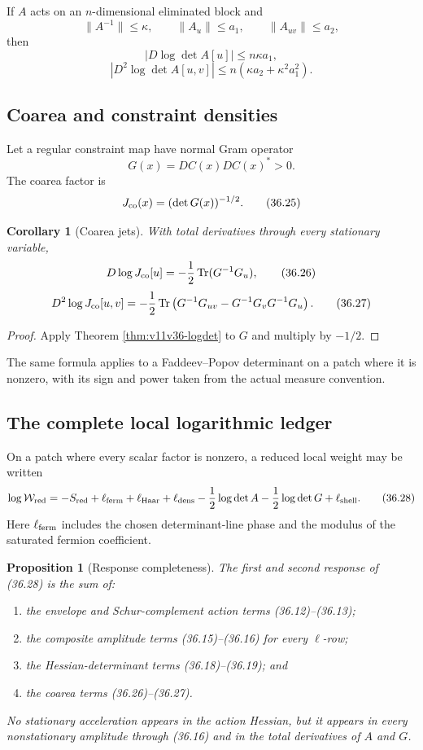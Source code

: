 \documentclass[11pt]{article}
\newtheorem{proposition}[theorem]{Proposition}
\newtheorem{corollary}[theorem]{Corollary}
\newcommand{\Tr}{\operatorname{Tr}}
\begin{document}
If \(A\) acts on an \(n\)-dimensional eliminated block and
\[
 \|A^{-1}\|\leq\kappa,\qquad
 \|A_u\|\leq a_1,\qquad \|A_{uv}\|\leq a_2,
 \tag{36.21}
\]
then
\[
 |D\log\det A[u]|\leq n\kappa a_1,
 \tag{36.22}
\]
\[
 |D^2\log\det A[u,v]|
 \leq n(\kappa a_2+\kappa^2a_1^2).
 \tag{36.23}
\]

\subsection{Coarea and constraint densities}

Let a regular constraint map have normal Gram operator
\[
 G(x)=D C(x)D C(x)^*>0.
 \tag{36.24}
\]
The coarea factor is
\[
 J_{\rm co}(x)=(\det G(x))^{-1/2}.
 \tag{36.25}
\]

\begin{corollary}[Coarea jets]
\label{cor:v11v36-coarea}
With total derivatives through every stationary variable,
\[
 D\log J_{\rm co}[u]
 =
 -\frac12\Tr(G^{-1}G_u),
 \tag{36.26}
\]
\[
 D^2\log J_{\rm co}[u,v]
 =
 -\frac12\Tr\left(
 G^{-1}G_{uv}-G^{-1}G_vG^{-1}G_u
 \right).
 \tag{36.27}
\]
\end{corollary}

\begin{proof}
Apply Theorem \ref{thm:v11v36-logdet} to \(G\) and multiply by
\(-1/2\).
\end{proof}

The same formula applies to a Faddeev--Popov determinant on a patch
where it is nonzero, with its sign and power taken from the actual
measure convention.

\subsection{The complete local logarithmic ledger}

On a patch where every scalar factor is nonzero, a reduced local weight
may be written
\[
 \log\mathcal W_{\rm red}
 =
 -S_{\rm red}
 +\ell_{\rm ferm}
 +\ell_{\rm Haar}
 +\ell_{\rm dens}
 -\frac12\log\det A
 -\frac12\log\det G
 +\ell_{\rm shell}.
 \tag{36.28}
\]
Here \(\ell_{\rm ferm}\) includes the chosen determinant-line phase and
the modulus of the saturated fermion coefficient.

\begin{proposition}[Response completeness]
\label{prop:v11v36-ledger}
The first and second response of (36.28) is the sum of:
\begin{enumerate}[label=\textnormal{(\roman*)}]
\item the envelope and Schur-complement action terms
(36.12)--(36.13);
\item the composite amplitude terms (36.15)--(36.16) for every
\(\ell\)-row;
\item the Hessian-determinant terms (36.18)--(36.19); and
\item the coarea terms (36.26)--(36.27).
\end{enumerate}
No stationary acceleration appears in the action Hessian, but it appears
in every nonstationary amplitude through (36.16) and in the total
derivatives of \(A\) and \(G\).
\end{proposition}
\end{document}
